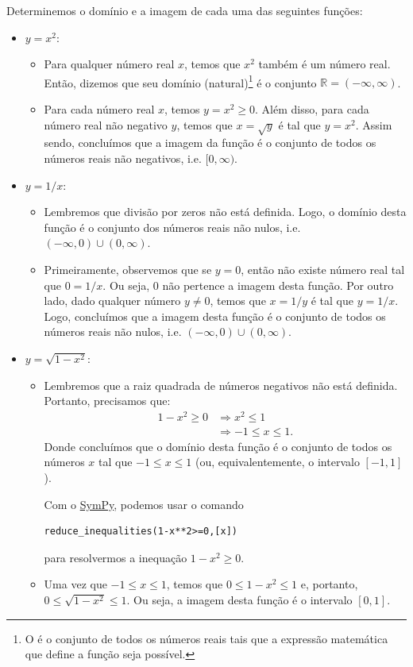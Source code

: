 \begin{ex}
  Determinemos o domínio e a imagem de cada uma das seguintes funções:
  \begin{itemize}
  \item $y=x^2$:
    \begin{itemize}
    \item Para qualquer número real $x$, temos que $x^2$ também é um número real. Então, dizemos que seu domínio (natural)\footnote{O  é o conjunto de todos os números reais tais que a expressão matemática que define a função seja possível.} é o conjunto $\mathbb{R} = (-\infty, \infty)$.
    \item Para cada número real $x$, temos $y=x^2\geq0$. Além disso, para cada número real não negativo $y$, temos que $x=\sqrt{y}$ é tal que $y=x^2$. Assim sendo, concluímos que a imagem da função é o conjunto de todos os números reais não negativos, i.e. $[0, \infty)$.
    \end{itemize}
  \item $y=1/x$:
    \begin{itemize}
    \item Lembremos que divisão por zeros não está definida. Logo, o domínio desta função é o conjunto dos números reais não nulos, i.e. $(-\infty, 0)\cup (0, \infty)$.
    \item Primeiramente, observemos que se $y=0$, então não existe número real tal que $0=1/x$. Ou seja, $0$ não pertence a imagem desta função. Por outro lado, dado qualquer número $y\neq 0$, temos que $x=1/y$ é tal que $y=1/x$. Logo, concluímos que a imagem desta função é o conjunto de todos os números reais não nulos, i.e. $(-\infty, 0)\cup (0, \infty)$.
    \end{itemize}
  \item $y=\sqrt{1-x^2}$:
    \begin{itemize}
    \item Lembremos que a raiz quadrada de números negativos não está definida. Portanto, precisamos que:
      \begin{align}
        1-x^2\geq 0 &\Rightarrow x^2 \leq 1\\
                    &\Rightarrow -1 \leq x \leq 1.
      \end{align}
      Donde concluímos que o domínio desta função é o conjunto de todos os números $x$ tal que $-1\leq x \leq 1$ (ou, equivalentemente, o intervalo $[-1, 1]$).
      
      \ifispython
      Com o \href{https://www.sympy.org}{SymPy}, podemos usar o comando
\begin{verbatim}
reduce_inequalities(1-x**2>=0,[x])
\end{verbatim}
      para resolvermos a inequação $1-x^2\geq 0$.
      \fi
    \item Uma vez que $-1 \leq x \leq 1$, temos que $0 \leq 1-x^2 \leq 1$ e, portanto, $0\leq \sqrt{1-x^2} \leq 1$. Ou seja, a imagem desta função é o intervalo $[0, 1]$.
    \end{itemize}
  \end{itemize}
\end{ex}

